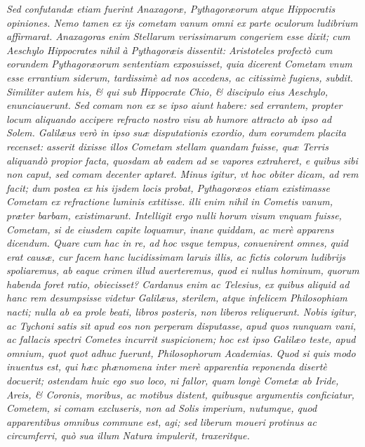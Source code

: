 \documentclass[11pt,twoside,openany]{book}
\begin{document}
\par\bigskip\noindent{}\enspace \textit{Sed confutandæ etiam fuerint Anaxagoræ, Pythagoræorum atque Hippocratis opiniones. Nemo tamen ex ijs cometam vanum omni ex parte oculorum ludibrium affirmarat. Anaxagoras enim Stellarum verissimarum congeriem esse dixit; cum Aeschylo Hippocrates nihil à Pythagoræis dissentit: Aristoteles profectò cum eorundem Pythagoræorum sententiam exposuisset, quia dicerent Cometam vnum esse errantium siderum, tardissimè ad nos accedens, ac citissimè fugiens, subdit. Similiter autem his, \& qui sub Hippocrate Chio, \& discipulo eius Aeschylo, enunciauerunt. Sed comam non ex se ipso aiunt habere: sed errantem, propter locum aliquando accipere refracto nostro visu ab humore attracto ab ipso ad Solem. Galilæus verò in ipso suæ disputationis exordio, dum eorumdem placita }\textit{recenset: asserit dixisse illos Cometam stellam quandam fuisse, quæ Terris aliquandò propior facta, quosdam ab eadem ad se vapores extraheret, e quibus sibi non caput, sed comam decenter aptaret. Minus igitur, vt hoc obiter dicam, ad rem facit; dum postea ex his ijsdem locis probat, Pythagoræos etiam existimasse Cometam ex refractione luminis extitisse. illi enim nihil in Cometis vanum, præter barbam, existimarunt. Intelligit ergo nulli horum visum vnquam fuisse, Cometam, si de eiusdem capite loquamur, inane quiddam, ac merè apparens dicendum. Quare cum hac in re, ad hoc vsque tempus, conuenirent omnes, quid erat causæ, cur facem hanc lucidissimam laruis illis, ac fictis colorum ludibrijs spoliaremus, ab eaque crimen illud auerteremus, quod ei nullus hominum, quorum habenda foret ratio, obiecisset? Cardanus enim ac Telesius, ex quibus aliquid ad hanc rem desumpsisse videtur Galilæus, sterilem, atque infelicem Philosophiam nacti; nulla ab ea prole beati, libros posteris, non liberos reliquerunt. Nobis igitur, ac Tychoni satis sit apud eos non perperam disputasse, apud quos nunquam vani, ac fallacis spectri Cometes incurrit suspicionem; hoc est ipso Galilæo teste, apud omnium, quot quot adhuc fuerunt, Philosophorum Academias. Quod si quis modo inuentus est, qui hæc phænomena inter merè apparentia reponenda disertè docuerit; ostendam huic ego suo loco, ni fallor, quam longè Cometæ ab Iride, Areis, \& Coronis, moribus, ac motibus distent, quibusque argumentis conficiatur, Cometem, si comam excluseris, non ad Solis imperium, nutumque, quod apparentibus omnibus commune est, agi; sed liberum moueri protinus ac circumferri, quò sua illum Natura impulerit, traxeritque.}
\end{document}
